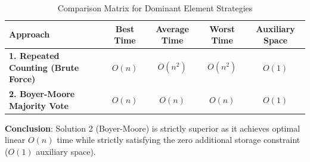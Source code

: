 \begin{table}[htbp]
\centering
\small
\caption{Comparison Matrix for Dominant Element Strategies}
\label{tab:problem6_complexity}
\begin{tabularx}{\textwidth}{@{} >{\raggedright\arraybackslash}X c c c c @{}}
\toprule
\textbf{Approach} & \textbf{Best Time} & \textbf{Average Time} & \textbf{Worst Time} & \textbf{Auxiliary Space} \\
\midrule
\textbf{1. Repeated Counting (Brute Force)} & $O(n)$ & $O(n^2)$ & $O(n^2)$ & $O(1)$ \\
\textbf{2. Boyer-Moore Majority Vote} & $O(n)$ & $O(n)$ & $O(n)$ & $O(1)$ \\
\bottomrule
\end{tabularx}
\end{table}

\textbf{Conclusion}: Solution 2 (Boyer-Moore) is strictly superior as it achieves optimal linear $O(n)$ time while strictly satisfying the zero additional storage constraint ($O(1)$ auxiliary space).
